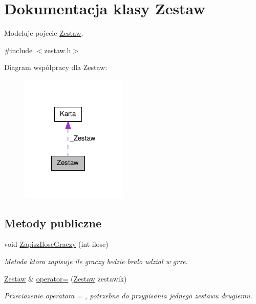 \hypertarget{class_zestaw}{\section{Dokumentacja klasy Zestaw}
\label{class_zestaw}
}


Modeluje pojecie \hyperlink{class_zestaw}{Zestaw}.  




{\ttfamily \#include $<$zestaw.\-h$>$}



Diagram współpracy dla Zestaw\-:\nopagebreak
\begin{figure}[H]
\begin{center}
\leavevmode
\includegraphics[width=145pt]{class_zestaw__coll__graph}
\end{center}
\end{figure}
\subsection*{Metody publiczne}
\begin{DoxyCompactItemize}
\item 
void \hyperlink{class_zestaw_ac037ccc99de7d6c19c802557c94054c7}{Zapisz\-Ilosc\-Graczy} (int ilosc)
\begin{DoxyCompactList}\small\item\em Metoda ktora zapisuje ile graczy bedzie bralo udzial w grze. \end{DoxyCompactList}\item 
\hyperlink{class_zestaw}{Zestaw} \& \hyperlink{class_zestaw_a60688eb0fd4cfcf8030ac0279df6cf4f}{operator=} (\hyperlink{class_zestaw}{Zestaw} zestawik)
\begin{DoxyCompactList}\small\item\em Przeciazenie operatora = , potrzebne do przypisania jednego zestawu drugiemu. \end{DoxyCompactList}\end{DoxyCompactItemize}
